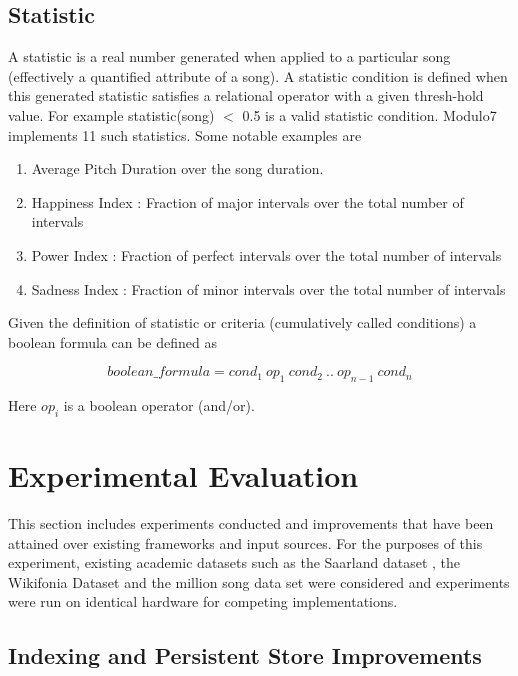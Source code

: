\documentclass{article}
\begin{document}
\subsection{Statistic}

A statistic is a real number generated when applied to a particular song (effectively a quantified attribute of a song). A statistic condition is defined when this generated statistic satisfies a relational operator with a given thresh-hold value. For example statistic(song) $<$ 0.5 is a valid statistic condition. Modulo7 implements 11 such statistics. Some notable examples are 

\begin{enumerate}
\item Average Pitch Duration over the song duration. 
\item Happiness Index : Fraction of major intervals over the total number of intervals
\item Power Index : Fraction of perfect intervals over the total number of intervals
\item Sadness Index : Fraction of minor intervals over the total number of intervals
\end{enumerate}

\noindent Given the definition of statistic or criteria (cumulatively called conditions) a boolean formula can be defined as 

\begin{equation}
boolean\_formula = cond_1 \ op_1 \ cond_2 \ .. \ op_{n-1} \ cond_n
\end{equation}
 
\noindent Here $op_i$ is a boolean operator (and/or).  

\section{Experimental Evaluation}

This section includes experiments conducted and improvements that have been attained over existing frameworks and input sources. For the purposes of this experiment, existing academic datasets such as the Saarland dataset \cite{saarlandmsd}, the Wikifonia Dataset \cite{WikifoniaDataset} and the million song data set \cite{msd} were considered and experiments were run on identical hardware for competing implementations. 

\subsection{Indexing and Persistent Store Improvements}
\end{document}
